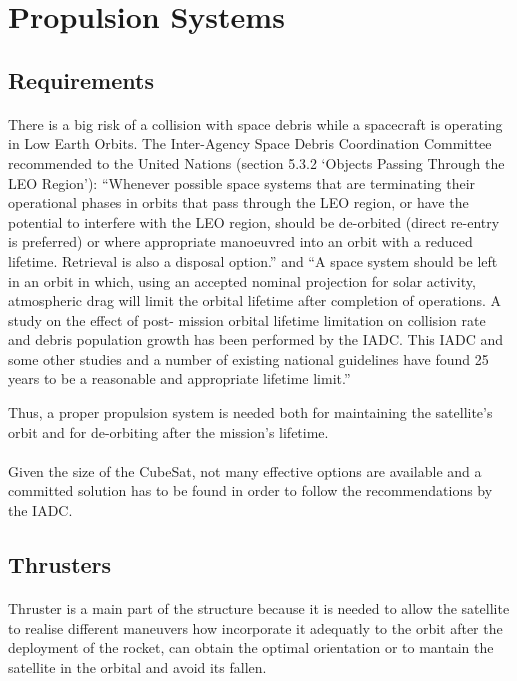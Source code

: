 \section{Propulsion Systems}
\label{ch:PS}
\subsection{Requirements}

\paragraph{}
There is a big risk of a collision with space debris while a spacecraft is operating in Low Earth Orbits. The Inter-Agency Space Debris Coordination Committee recommended to the United Nations (section 5.3.2 ‘Objects Passing Through the LEO Region’): “Whenever possible space systems that are terminating their operational phases in orbits that pass through the LEO region, or have the potential to interfere with the LEO region, should be de-orbited (direct re-entry is preferred) or where appropriate manoeuvred into an orbit with a reduced lifetime. Retrieval is also a disposal option.” and “A space system should be left in an orbit in which, using an accepted nominal projection for solar activity, atmospheric drag will limit the orbital lifetime after completion of operations. A study on the effect of post- mission orbital lifetime limitation on collision rate and debris population growth has been performed by the IADC. This IADC and some other studies and a number of existing national guidelines have found 25 years to be a reasonable and appropriate lifetime limit.” \cite{collisionLEO}

Thus, a proper propulsion system is needed both for maintaining the satellite's orbit and for de-orbiting after the mission's lifetime.

\paragraph{}
Given the size of the CubeSat, not many effective options are available and a committed solution has to be found in order to follow the recommendations by the IADC.


\subsection{Thrusters}

\paragraph{}
Thruster is a main part of the structure because it is needed to allow the satellite to realise different maneuvers how incorporate it adequatly to the orbit after the deployment of the rocket, can obtain the optimal orientation or to mantain the satellite in the orbital and avoid its fallen. 

